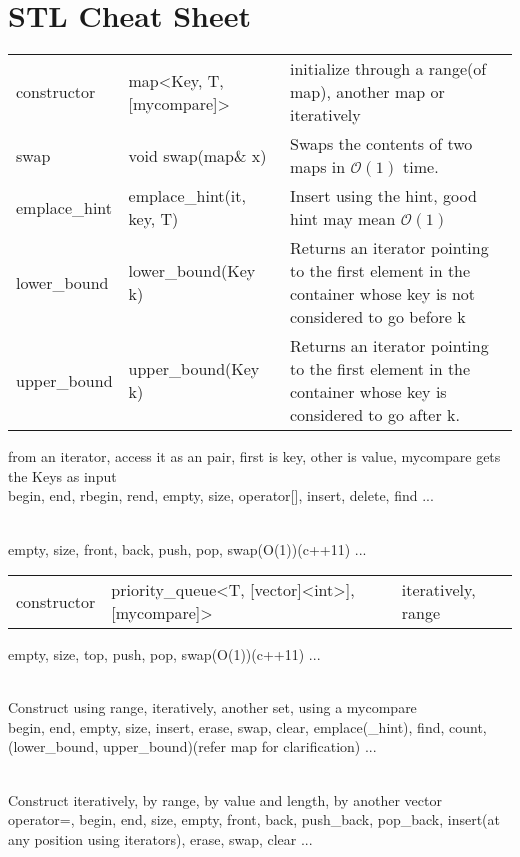 \section{STL Cheat Sheet}



\begin{tabular}{p{2cm}|p{5cm}|p{5.5cm}}
    constructor &   map\textless Key, T, [mycompare]\textgreater     &   initialize through a range(of map), another map or iteratively \\
    swap    &   void swap(map\& x)   &   Swaps the contents of two maps in $\mathcal{O}(1)$ time. \\
    emplace\_hint    &   emplace\_hint(it, key, T)    &   Insert using the hint, good hint may mean $\mathcal{O}(1)$  \\
    lower\_bound &   lower\_bound(Key k)  &   Returns an iterator pointing to the first element in the container whose key is not considered to go before k \\
    upper\_bound &   upper\_bound(Key k)  &   Returns an iterator pointing to the first element in the container whose key is considered to go after k. 
\end{tabular}

from an iterator, access it as an pair, first is key, other is value, mycompare gets the Keys as input \\
begin, end, rbegin, rend, empty, size, operator[], insert, delete, find ...

 \\
empty, size, front, back, push, pop, swap(O(1))(c++11) ...

\begin{tabular}{p{2cm}|p{5cm}|p{5.5cm}}
    constructor &   priority\_queue\textless T, [vector]\textless int\textgreater ], [mycompare]\textgreater    &   iteratively, range  \\
\end{tabular}

empty, size, top, push, pop, swap(O(1))(c++11) ...

 \\
Construct using range, iteratively, another set, using a mycompare \\
begin, end, empty, size, insert, erase, swap, clear, emplace(\_hint), find, count, (lower\_bound, upper\_bound)(refer map for clarification) ... 

 \\
Construct iteratively, by range, by value and length, by another vector \\
operator=, begin, end, size, empty, front, back, push\_back, pop\_back, insert(at any position using iterators), erase, swap, clear ...

